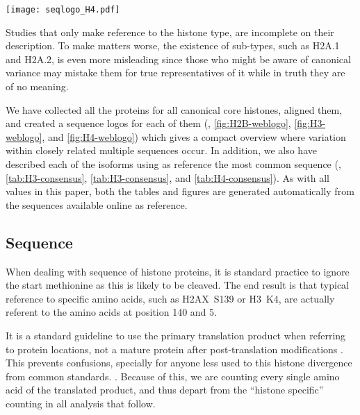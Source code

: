   \begin{TableAndFigure*}
    \label{tab:H4-consensus}
    

    \texttt{[image: seqlogo\_H4.pdf]}
    \label{fig:H4-weblogo}
  \end{TableAndFigure*}

  Studies that only make reference to the histone type,
  are incomplete on their description. To make matters worse, the existence
  of sub-types, such as H2A.1 and H2A.2, is even more misleading since those
  who might be aware of canonical variance may mistake them for true
  representatives of it while in truth they are of no meaning.

  We have collected all the proteins for all canonical core histones, aligned
  them, and created a sequence logos for each of them (,
  \ref{fig:H2B-weblogo}, \ref{fig:H3-weblogo}, and \ref{fig:H4-weblogo}) which
  gives a compact overview where variation within closely related multiple
  sequences occur. In addition, we also have described each of the isoforms
  using as reference the most common sequence (,
  \ref{tab:H3-consensus}, \ref{tab:H3-consensus}, and \ref{tab:H4-consensus}).
  As with all values in this paper, both the tables and figures are generated
  automatically from the sequences available online as reference.


  \subsection{Sequence}
    When dealing with sequence of histone proteins, it is standard practice to
    ignore the start methionine as this is likely to be cleaved. The end
    result is that typical reference to specific amino acids, such as H2AX~S139
    or H3~K4, are actually referent to the amino acids at position 140 and 5.

    It is a standard guideline to use the primary translation product when
    referring to protein locations, not a mature protein after
    post-translation modifications \citep{desc-seq-variant}.
    This prevents confusions, specially for anyone less
    used to this histone divergence from common standards.
    .
    Because of this, we are counting every single amino acid of the translated
    product, and thus depart from the ``histone specific'' counting in all
    analysis that follow.


